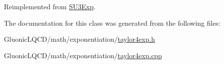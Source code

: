 Reimplemented from \mbox{\hyperlink{class_s_u3_exp_a9760c17b9c3a4b6d0a5cd4d88c6d577e}{S\+U3\+Exp}}.



The documentation for this class was generated from the following files\+:\begin{DoxyCompactItemize}
\item 
Gluonic\+L\+Q\+C\+D/math/exponentiation/\mbox{\hyperlink{taylor4exp_8h}{taylor4exp.\+h}}\item 
Gluonic\+L\+Q\+C\+D/math/exponentiation/\mbox{\hyperlink{taylor4exp_8cpp}{taylor4exp.\+cpp}}\end{DoxyCompactItemize}
